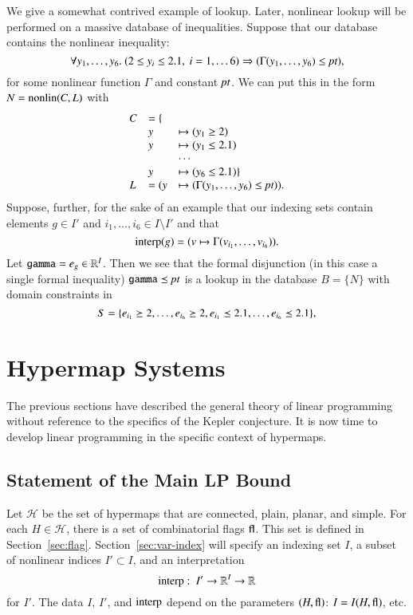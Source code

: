 \begin{example}  We give a somewhat contrived example of lookup.
Later, nonlinear lookup will be performed on a massive database of
inequalities.  Suppose that our database contains the nonlinear
inequality:
    $$\forall y_1,\ldots,y_6.\ (2\le y_i \le 2.1,\ i=1,\ldots
    6) \Rightarrow (\Gamma(y_1,\ldots,y_6) \le \hbox{\it pt}),
    $$
    for some nonlinear function $\Gamma$ and constant $\hbox{\it pt}$.
We can put this in the form $N = {\operatorname{nonlin}}(C,L)$ with
    $$
    \begin{array}{llll}
    C &= \{\\
        &y&\mapsto (y_1\ge 2)\\
        &y&\mapsto (y_1\le 2.1)\\
        &&\cdots\\
        &y&\mapsto (y_6\le 2.1)\}\\
    L &= (y&\mapsto (\Gamma(y_1,\ldots,y_6)\le \hbox{\it pt})).
    \end{array}
    $$
Suppose, further, for the sake of an example that our indexing
sets contain elements $g\in I'$ and $i_1,\ldots,i_6\in I\setminus
I'$ and that
    $$
    {\operatorname{interp}}(g) = (v \mapsto \Gamma(v_{i_1},\ldots,v_{i_6})).
    $$
Let ${\operatorname{{\texttt{gamma}}}} = e_g \in\mathbb{R}^{I}$. Then we see that the
formal disjunction (in this case a single formal inequality)
${\operatorname{{\texttt{gamma}}}} \preceq \hbox{\it pt}$ is a lookup in the database $B = \{N\}$
with domain constraints in
    $$
    S = \{e_{i_1}\succeq 2,\ldots,e_{i_6}\succeq 2,
          e_{i_1}\preceq 2.1,\ldots, e_{i_6}\preceq 2.1\},
    $$
\end{example}


\section{Hypermap Systems}

The previous sections have described the general theory of linear
programming without reference to the specifics of the Kepler
conjecture.  It is now time to develop linear programming in the
specific context of  hypermaps.

\subsection{Statement of the Main LP Bound}

Let $\mathcal H$ be the set of  hypermaps that are connected,
plain, planar, and simple. For each $H\in \mathcal H$, there is a
set of combinatorial flags ${\operatorname{fl}}$.  This set is defined in
Section~\ref{sec:flag}.  Section~\ref{sec:var-index} will specify
an indexing set $I$, a subset of nonlinear indices $I'\subset I$,
and an interpretation
  $${\operatorname{interp}}:\ I'\to \mathbb{R}^I\to\mathbb{R}$$
for $I'$.  The data $I$, $I'$, and ${\operatorname{interp}}$ depend on the
parameters $(H,{\operatorname{fl}})$: $I = I(H,{\operatorname{fl}})$, etc.

